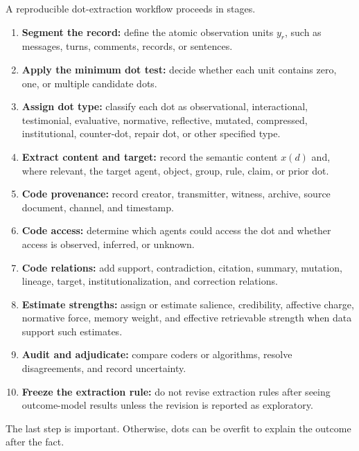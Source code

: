 \documentclass[11pt]{article}
\theoremstyle{remark}
\begin{document}
A reproducible dot-extraction workflow proceeds in stages.

\begin{enumerate}[leftmargin=*]
\item \textbf{Segment the record:} define the atomic observation units
\(y_r\), such as messages, turns, comments, records, or sentences.
\item \textbf{Apply the minimum dot test:} decide whether each unit
contains zero, one, or multiple candidate dots.
\item \textbf{Assign dot type:} classify each dot as observational,
interactional, testimonial, evaluative, normative, reflective, mutated,
compressed, institutional, counter-dot, repair dot, or other specified
type.
\item \textbf{Extract content and target:} record the semantic content
\(x(d)\) and, where relevant, the target agent, object, group, rule,
claim, or prior dot.
\item \textbf{Code provenance:} record creator, transmitter, witness,
archive, source document, channel, and timestamp.
\item \textbf{Code access:} determine which agents could access the dot
and whether access is observed, inferred, or unknown.
\item \textbf{Code relations:} add support, contradiction, citation,
summary, mutation, lineage, target, institutionalization, and correction
relations.
\item \textbf{Estimate strengths:} assign or estimate salience,
credibility, affective charge, normative force, memory weight, and
effective retrievable strength when data support such estimates.
\item \textbf{Audit and adjudicate:} compare coders or algorithms,
resolve disagreements, and record uncertainty.
\item \textbf{Freeze the extraction rule:} do not revise extraction rules
after seeing outcome-model results unless the revision is reported as
exploratory.
\end{enumerate}

The last step is important. Otherwise, dots can be overfit to explain the
outcome after the fact.
\end{document}
